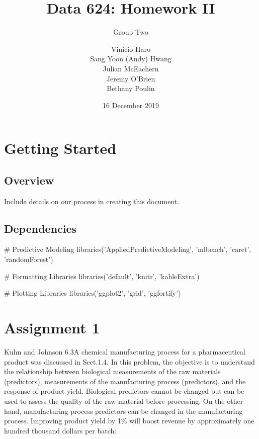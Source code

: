 \documentclass[openany]{report}
\title{Data 624: Homework II}
\subtitle{Group Two}
\author{Vinicio Haro \\ Sang Yoon (Andy) Hwang \\ Julian McEachern \\ Jeremy O'Brien \\ Bethany Poulin}
\date{16 December 2019}
\newenvironment{Shaded}{\begin{snugshade}}{\end{snugshade}}
\newcommand{\CommentTok}[1]{\textcolor[rgb]{0.50,0.62,0.50}{#1}}
\newcommand{\KeywordTok}[1]{\textcolor[rgb]{0.94,0.87,0.69}{#1}}
\newcommand{\NormalTok}[1]{\textcolor[rgb]{0.80,0.80,0.80}{#1}}
\newcommand{\StringTok}[1]{\textcolor[rgb]{0.80,0.58,0.58}{#1}}
\begin{document}
\maketitle

{
\setcounter{tocdepth}{2}
\tableofcontents
}
\hypertarget{Overview}{%
\chapter*{Getting Started}\label{Overview}}

\hypertarget{overview}{%
\section{Overview}\label{overview}}

Include details on our process in creating this document.

\hypertarget{dependencies}{%
\section{Dependencies}\label{dependencies}}

\begin{Shaded}
\begin{Highlighting}[]
\CommentTok{# Predictive Modeling}
\KeywordTok{libraries}\NormalTok{(}\StringTok{'AppliedPredictiveModeling'}\NormalTok{, }\StringTok{'mlbench'}\NormalTok{, }\StringTok{'caret'}\NormalTok{, }\StringTok{'randomForest'}\NormalTok{)}

\CommentTok{# Formatting Libraries}
\KeywordTok{libraries}\NormalTok{(}\StringTok{'default'}\NormalTok{, }\StringTok{'knitr'}\NormalTok{, }\StringTok{'kableExtra'}\NormalTok{)}

\CommentTok{# Plotting Libraries}
\KeywordTok{libraries}\NormalTok{(}\StringTok{'ggplot2'}\NormalTok{, }\StringTok{'grid'}\NormalTok{, }\StringTok{'ggfortify'}\NormalTok{)}
\end{Highlighting}
\end{Shaded}

\hypertarget{AS-1}{%
\chapter*{Assignment 1}\label{AS-1}}


\begin{question}{Kuhn and Johnson 6.3}A chemical manufacturing process for a pharmaceutical product was discussed in Sect.1.4. In this problem, the objective is to understand the relationship between biological measurements of the raw materials (predictors), measurements of the manufacturing process (predictors), and the response of product yield. Biological predictors cannot be changed but can be used to assess the quality of the raw material before processing. On the other hand, manufacturing process predictors can be changed in the manufacturing process. Improving product yield by 1\% will boost revenue by approximately one hundred thousand dollars per batch:\end{question}
\end{document}
